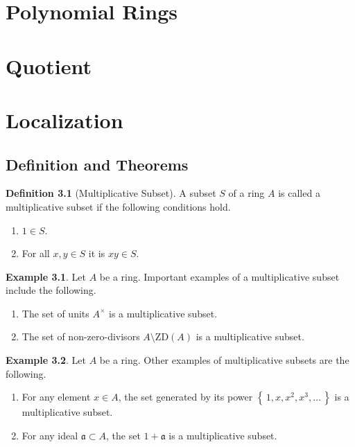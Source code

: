 \documentclass[a4paper]{book}
\theoremstyle{definition}
\newtheorem{definition}{Definition}[]
\newtheorem{example}{Example}[definition]
\newcommand{\set}[1]{\left\{\, #1 \,\right\}}
\begin{document}
\chapter{Polynomial Rings}

\chapter{Quotient}

\chapter{Localization}

\section{Definition and Theorems}

\begin{defbox}
    \begin{definition}[Multiplicative Subset]
        A subset \(S\) of a ring \(A\) is called a multiplicative subset if the following conditions hold.
        \begin{enumerate}
            \item \(1 \in S\).
            \item For all \(x, y \in S\) it is \(xy \in S\).
        \end{enumerate}
    \end{definition}
\end{defbox}

\begin{exmbox}
    \begin{example}
        Let \(A\) be a ring. Important examples of a multiplicative subset include the following.
        \begin{enumerate}
            \item The set of units \(A^\times\) is a multiplicative subset.
            \item The set of non-zero-divisors \(A \setminus \mathrm{ZD}(A)\) is a multiplicative subset.
        \end{enumerate}
    \end{example}
\end{exmbox}

\begin{example}
    Let \(A\) be a ring. Other examples of multiplicative subsets are the following.
    \begin{enumerate}
        \item For any element \(x \in A\), the set generated by its power \(\set{1, x, x^2, x^3, \ldots}\) is a multiplicative subset.
        \item For any ideal \(\mathfrak{a} \subset A\), the set \(1 + \mathfrak{a}\) is a multiplicative subset.
    \end{enumerate}
\end{example}
\end{document}
